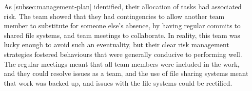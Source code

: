     As \autoref{subsec:management-plan} identified, their allocation of tasks had associated risk.
    The team showed that they had contingencies to allow another team member to substitute for someone else's absence, by having regular commits to shared file systems, and team meetings to collaborate.
    In reality, this team was lucky enough to avoid such an eventuality, but their clear risk management strategies fostered behaviours that were generally conducive to performing well.
    The regular meetings meant that all team members were included in the work, and they could resolve issues as a team, and the use of file sharing systems meant that work was backed up, and issues with the file systems could be rectified.



